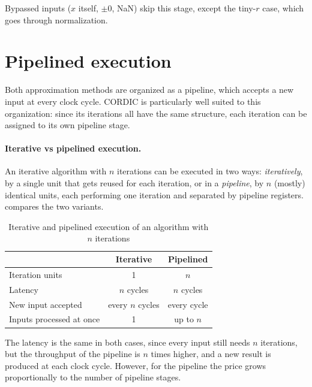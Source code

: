 Bypassed inputs ($x$ itself, $\pm 0$, NaN) skip this stage,
except the tiny-$r$ case, which goes through normalization.

\section{Pipelined execution}
\label{sec:pipeline}

Both approximation methods are organized as a pipeline, which accepts a new
input at every clock cycle. CORDIC is particularly well suited to this
organization: since its iterations all have the same structure, each
iteration can be assigned to its own pipeline stage.

\paragraph{Iterative vs pipelined execution.}
An iterative algorithm with $n$ iterations can be executed in two ways:
\emph{iteratively}, by a single unit that gets reused for each iteration,
or in a \emph{pipeline}, by $n$ (mostly) identical units,
each performing one iteration and separated by pipeline registers.
 compares the two variants.

\begin{table}[H]
  \centering
  \caption{Iterative and pipelined execution of an algorithm with $n$
  iterations}
  \label{tab:iter-vs-pipe}
  \begin{tabular}{lcc}
    \toprule
    & Iterative & Pipelined \\
    \midrule
    Iteration units            & 1                & $n$             \\
    Latency                    & $n$ cycles       & $n$ cycles      \\
    New input accepted         & every $n$ cycles & every cycle     \\
    Inputs processed at once   & 1                & up to $n$       \\
    \bottomrule
  \end{tabular}
\end{table}

The latency is the same in both cases, since every input still needs $n$ iterations,
but the throughput of the pipeline is $n$ times higher, and a new result is produced
at each clock cycle. However, for the pipeline the price grows proportionally to the
number of pipeline stages.

